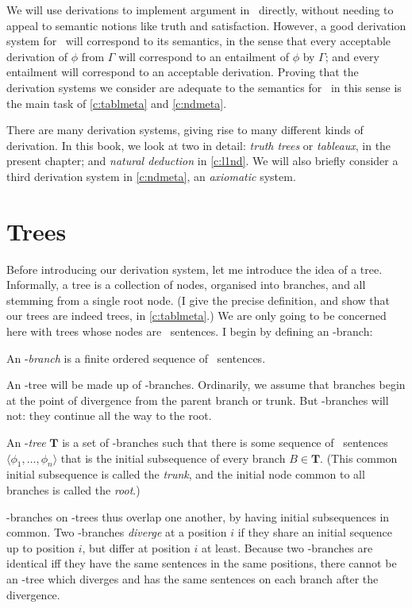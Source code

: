 We will use derivations to implement argument in \lone\ directly, without needing to appeal to semantic notions like truth and satisfaction. However, a good derivation system for \lone\ will correspond to its semantics, in the sense that every acceptable derivation of $\phi$ from $\Gamma$ will correspond to an entailment of $\phi$ by $\Gamma$; and every entailment will correspond to an acceptable derivation. Proving that the derivation systems we consider are adequate to the semantics for \lone\ in this sense is the main task of \autoref{c:tablmeta} and \autoref{c:ndmeta}.

There are many derivation systems, giving rise to many different kinds of derivation. In this book, we look at two in detail: \emph{truth trees} or \emph{tableaux}, in the present chapter; and \emph{natural deduction} in \autoref{c:l1nd}. We will also briefly consider a third derivation system in \autoref{c:ndmeta}, an \emph{axiomatic} system.

\section{Trees}

Before introducing our derivation system, let me introduce the idea of a tree. Informally, a tree is a collection of nodes, organised into branches, and all stemming from a single root node. (I give the precise definition, and show that our trees are indeed trees, in \autoref{c:tablmeta}.) We are only going to be concerned here with trees whose nodes are \lone\ sentences. I begin by defining an \lone-branch: \begin{definition}\label{lonebranch}
	An \lone-\emph{branch} is a finite ordered sequence of \lone\ sentences.
\end{definition}
An \lone-tree will be made up of \lone-branches. Ordinarily, we assume that branches begin at the point of divergence from the parent branch or trunk. But \lone-branches will not: they continue all the way to the root. \begin{definition}\label{l1tree}
	An \lone-\emph{tree} $\mathbf{T}$ is a set of \lone-branches such that there is some sequence of \lone\ sentences $\langle \phi_{1},…,\phi_{n}\rangle$ that is the initial subsequence of every branch $B \in \mathbf{T}$. (This common initial subsequence is called the \emph{trunk}, and the initial node common to all branches is called the \emph{root}.)
\end{definition} 
\lone-branches on \lone-trees thus overlap one another, by having initial subsequences in common. Two \lone-branches \emph{diverge} at a position $i$ if they share an initial sequence up to position $i$, but differ at position $i$ at least. Because two \lone-branches are identical iff they have the same sentences in the same positions, there cannot be an \lone-tree which diverges and has the same sentences on each branch after the divergence.


